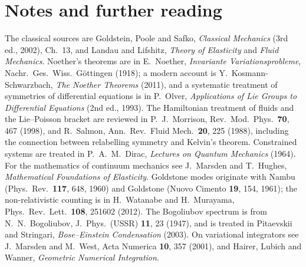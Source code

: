 \section*{Notes and further reading}

The classical sources are Goldstein, Poole and Safko, \emph{Classical Mechanics}
(3rd ed., 2002), Ch.~13, and Landau and Lifshitz, \emph{Theory of Elasticity}
and \emph{Fluid Mechanics}. Noether's theorems are in E.~Noether, \emph{Invariante
Variationsprobleme}, Nachr.\ Ges.\ Wiss.\ G\"ottingen (1918); a modern account is
Y.~Kosmann-Schwarzbach, \emph{The Noether Theorems} (2011), and a systematic treatment of
symmetries of differential equations is in P.~Olver, \emph{Applications of Lie
Groups to Differential Equations} (2nd ed., 1993). The Hamiltonian treatment of
fluids and the Lie--Poisson bracket are reviewed in P.~J.~Morrison, Rev.\ Mod.\ Phys.\
\textbf{70}, 467 (1998), and R.~Salmon, Ann.\ Rev.\ Fluid Mech.\ \textbf{20}, 225 (1988),
including the connection between relabelling symmetry and Kelvin's theorem.
Constrained systems are treated in P.~A.~M.~Dirac, \emph{Lectures on Quantum
Mechanics} (1964). For the mathematics of continuum mechanics see J.~Marsden and
T.~Hughes, \emph{Mathematical Foundations of Elasticity}. Goldstone modes originate
with Nambu (Phys.\ Rev.\ \textbf{117}, 648, 1960) and Goldstone (Nuovo Cimento
\textbf{19}, 154, 1961); the non-relativistic counting is in H.~Watanabe and
H.~Murayama, Phys.\ Rev.\ Lett.\ \textbf{108}, 251602 (2012). The Bogoliubov
spectrum is from N.~N.~Bogoliubov, J.\ Phys.\ (USSR) \textbf{11}, 23 (1947), and
is treated in Pitaevskii and Stringari, \emph{Bose--Einstein Condensation} (2003). On
variational integrators see J.~Marsden and M.~West, Acta Numerica \textbf{10}, 357
(2001), and Hairer, Lubich and Wanner, \emph{Geometric Numerical Integration}.
